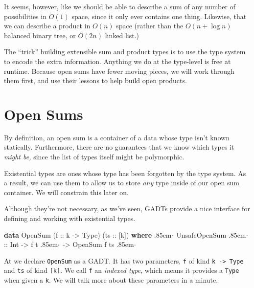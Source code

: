\documentclass[
  11pt,
]{book}
\makeatletter
\newenvironment{Shaded}{}{}
\newcommand{\DataTypeTok}[1]{\textcolor[rgb]{0.56,0.13,0.00}{#1}}
\newcommand{\KeywordTok}[1]{\textcolor[rgb]{0.00,0.44,0.13}{\textbf{#1}}}
\newcommand{\NormalTok}[1]{#1}
\newcommand{\OtherTok}[1]{\textcolor[rgb]{0.00,0.44,0.13}{#1}}
\newcommand{\anncirc}[1]{\raisebox{-0.5mm}{\tikz\node[text=white,
font=\sffamily\bfseries,minimum size=2mm,inner sep=0mm,draw,circle,fill=black]
{\small #1};}}
\newcommand{\ann}[1]{\hspace{1.5mm}\anncirc{#1}\hspace{1.5mm}}
\newcommand{\annotate}[1]{\Dotfill\quad\anncirc{#1}\qquad}
\newcommand{\Dotfill}{\leavevmode \cleaders \hb@xt@.85em{\ensuremath{\hss
\cdot\hss}}
\hfill \kern \z@}
\theoremstyle{nonumberplain}
\makeatother
\begin{document}
It seems, however, like we should be able to describe a sum of any
number of possibilities in \(O(1)\) space, since it only ever contains
one thing. Likewise, that we can describe a product in \(O(n)\) space
(rather than the \(O(n+\log{n})\) balanced binary tree, or \(O(2n)\)
linked list.)

The ``trick'' building extensible sum and product types is to use the
type system to encode the extra information. Anything we do at the
type-level is free at runtime. Because open sums have fewer moving
pieces, we will work through them first, and use their lessons to help
build open products.

\hypertarget{open-sums}{%
\section{Open Sums}\label{open-sums}}

By definition, an open sum is a container of a data whose type isn't
known statically. Furthermore, there are no guarantees that we know
which types it \emph{might be,} since the list of types itself might be
polymorphic.

Existential types are ones whose type has been forgotten by the type
system. As a result, we can use them to allow us to store \emph{any}
type inside of our open sum container. We will constrain this later on.

Although they're not necessary, as we've seen, GADTs provide a nice
interface for defining and working with existential types.

\begin{Shaded}
\begin{Highlighting}[]
\KeywordTok{data} \DataTypeTok{OpenSum}\NormalTok{ (}\OtherTok{f ::}\NormalTok{ k }\OtherTok{{-}\textgreater{}} \DataTypeTok{Type}\NormalTok{) (}\OtherTok{ts ::}\NormalTok{ [k]) }\KeywordTok{where} \annotate{1}
  \DataTypeTok{UnsafeOpenSum}  \annotate{2}
\OtherTok{      ::} \DataTypeTok{Int}
      \OtherTok{{-}\textgreater{}}\NormalTok{ f t }\annotate{3}
      \OtherTok{{-}\textgreater{}} \DataTypeTok{OpenSum}\NormalTok{ f ts }\annotate{4}
\end{Highlighting}
\end{Shaded}

At \ann{1} we declare \texttt{OpenSum} as a GADT. It has two parameters,
\texttt{f} of kind \texttt{k\ -\textgreater{}\ Type} and \texttt{ts} of
kind \texttt{{[}k{]}}. We call \texttt{f} an \emph{indexed type}, which
means it provides a \texttt{Type} when given a \texttt{k}. We will talk
more about these parameters in a minute.
\end{document}
